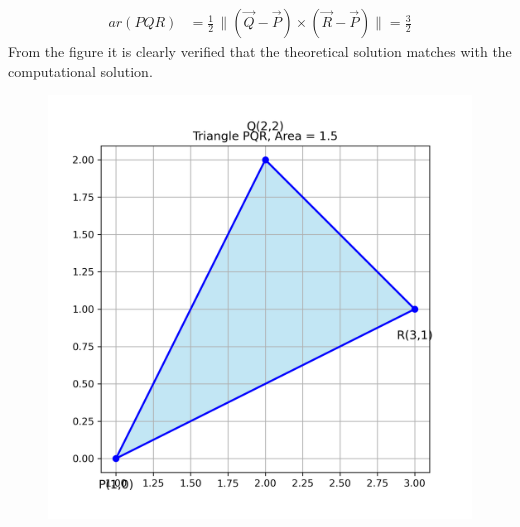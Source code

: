 \documentclass[journal]{IEEEtran}
\begin{document}
\begin{align}
ar(PQR) &= \frac{1}{2} \, \|(\vec{Q} - \vec{P}) \times (\vec{R} - \vec{P}) \|=\frac{3}{2}
\end{align}
From the figure it is clearly verified that the theoretical solution matches with the computational solution.\\
\begin{figure}[h!]
    \centering
    \includegraphics[height=0.5\textheight, keepaspectratio]{figs/triangle_area.png}
    \label{figure_1}
\end{figure}
 
\end{document}
